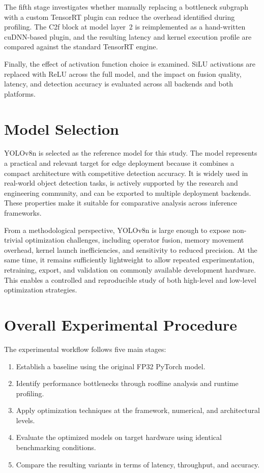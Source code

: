 \documentclass[12pt,a4paper]{report}
\begin{document}
The fifth stage investigates whether manually replacing a bottleneck subgraph with a custom TensorRT
plugin can reduce the overhead identified during profiling.
The C2f block at model layer~2 is reimplemented as a hand-written cuDNN-based plugin, and the
resulting latency and kernel execution profile are compared against the standard TensorRT engine.

Finally, the effect of activation function choice is examined.
SiLU activations are replaced with ReLU across the full model, and the impact on fusion quality,
latency, and detection accuracy is evaluated across all backends and both platforms.



\section{Model Selection}

YOLOv8n is selected as the reference model for this study. The model represents a practical and relevant target for
edge deployment because it combines a compact architecture with competitive detection accuracy. It is widely used in
real-world object detection tasks, is actively supported by the research and engineering community, and can be
exported to multiple deployment backends. These properties make it suitable for comparative analysis across inference
frameworks.

From a methodological perspective, YOLOv8n is large enough to expose non-trivial optimization challenges, including
operator fusion, memory movement overhead, kernel launch inefficiencies, and sensitivity to reduced precision. At the
same time, it remains sufficiently lightweight to allow repeated experimentation, retraining, export, and validation
on commonly available development hardware. This enables a controlled and reproducible study of both high-level and
low-level optimization strategies.

\section{Overall Experimental Procedure}

The experimental workflow follows five main stages:

\begin{enumerate}
    \item Establish a baseline using the original FP32 PyTorch model.
    \item Identify performance bottlenecks through roofline analysis and runtime profiling.
    \item Apply optimization techniques at the framework, numerical, and architectural levels.
    \item Evaluate the optimized models on target hardware using identical benchmarking conditions.
    \item Compare the resulting variants in terms of latency, throughput, and accuracy.
\end{enumerate}
\end{document}
